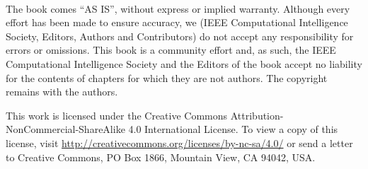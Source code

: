 
\ 
\vspace{7cm}

The book comes “AS IS”, without express or implied warranty. Although every effort has been made to ensure accuracy, we (IEEE Computational Intelligence Society, Editors, Authors and Contributors) do not accept any responsibility for errors or omissions.
This book is a community effort and, as such, the IEEE Computational Intelligence Society and the Editors of the book accept no liability for the contents of chapters for which they are not authors. The copyright remains with the authors.

This work is licensed under the Creative Commons Attribution-\\NonCommercial-ShareAlike 4.0 International License. To view a copy of this license, visit \url{http://creativecommons.org/licenses/by-nc-sa/4.0/} or send a letter to Creative Commons, PO Box 1866, Mountain View, CA 94042, USA.

